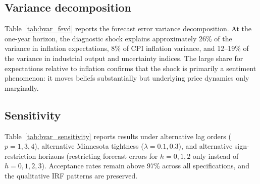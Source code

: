 

\subsection{Variance decomposition}

Table~\ref{tab:bvar_fevd} reports the forecast error variance decomposition. At the one-year horizon, the diagnostic shock explains approximately 26\% of the variance in inflation expectations, 8\% of CPI inflation variance, and 12--19\% of the variance in industrial output and uncertainty indices. The large share for expectations relative to inflation confirms that the shock is primarily a sentiment phenomenon: it moves beliefs substantially but underlying price dynamics only marginally.



\subsection{Sensitivity}

Table~\ref{tab:bvar_sensitivity} reports results under alternative lag orders ($p = 1, 3, 4$), alternative Minnesota tightness ($\lambda = 0.1, 0.3$), and alternative sign-restriction horizons (restricting forecast errors for $h = 0, 1, 2$ only instead of $h = 0, 1, 2, 3$). Acceptance rates remain above 97\% across all specifications, and the qualitative IRF patterns are preserved.



